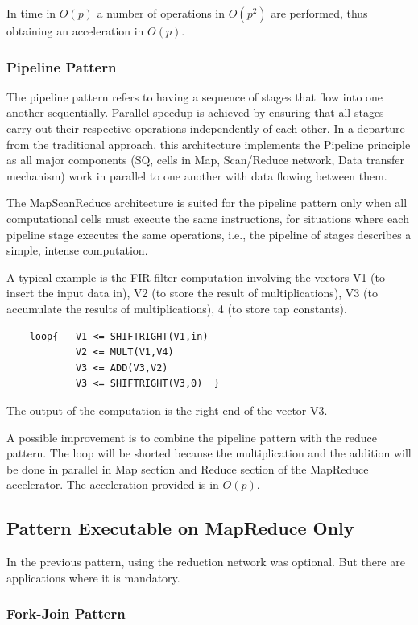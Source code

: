 In time in $O(p)$ a number of operations in $O(p^2)$ are performed, thus obtaining an acceleration in $O(p)$.


\subsubsection{Pipeline  Pattern} 

The pipeline pattern refers to having a sequence of stages that flow into one another sequentially. Parallel speedup is achieved by ensuring that all stages carry out their respective operations independently of each other. In a departure from the traditional approach, this architecture implements the Pipeline principle as all major components (SQ, cells in Map, Scan/Reduce network, Data transfer mechanism) work in parallel to one another with data flowing between them.

The MapScanReduce architecture is suited for the pipeline pattern only when all computational cells must execute the same instructions, for situations where each pipeline stage executes the same operations, i.e., the pipeline of stages describes a simple, intense computation.

A typical example is the FIR filter computation involving the vectors V1 (to insert the input data in), V2 (to store the result of multiplications), V3 (to accumulate the results of multiplications), 4 (to store tap constants).
\begin{verbatim}
    loop{   V1 <= SHIFTRIGHT(V1,in)
            V2 <= MULT(V1,V4)
            V3 <= ADD(V3,V2)
            V3 <= SHIFTRIGHT(V3,0)  }
\end{verbatim}

The output of the computation is the right end of the vector V3.

A possible improvement is to combine the pipeline pattern with the reduce pattern. The loop will be shorted because the multiplication and the addition will be done in parallel in Map section and Reduce section of the MapReduce accelerator. The acceleration provided is in $O(p)$.

\subsection{Pattern Executable on MapReduce Only }

In the previous pattern, using the reduction network was optional. But there are applications where it is mandatory.

\subsubsection{Fork-Join  Pattern}

